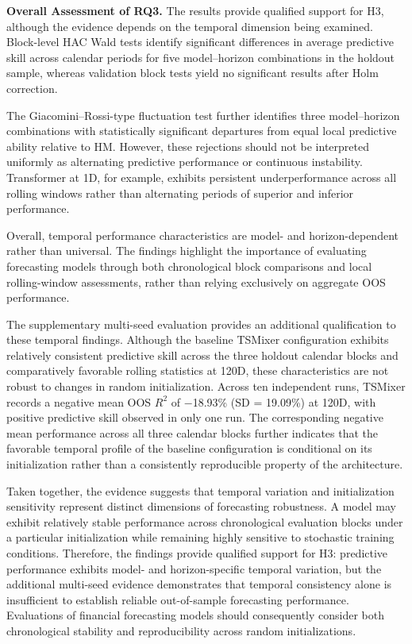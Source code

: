 \documentclass[12pt,twoside]{ord}
\begin{document}
\medskip
\noindent\textbf{Overall Assessment of RQ3.}
The results provide qualified support for H3, although the evidence depends on the temporal dimension being examined. Block-level HAC Wald tests identify significant differences in average predictive skill across calendar periods for five model--horizon combinations in the holdout sample, whereas validation block tests yield no significant results after Holm correction.

The Giacomini--Rossi-type fluctuation test further identifies three model--horizon combinations with statistically significant departures from equal local predictive ability relative to HM. However, these rejections should not be interpreted uniformly as alternating predictive performance or continuous instability. Transformer at 1D, for example, exhibits persistent underperformance across all rolling windows rather than alternating periods of superior and inferior performance.

Overall, temporal performance characteristics are model- and horizon-dependent rather than universal. The findings highlight the importance of evaluating forecasting models through both chronological block comparisons and local rolling-window assessments, rather than relying exclusively on aggregate OOS performance.

The supplementary multi-seed evaluation provides an additional qualification to these temporal findings. Although the baseline TSMixer configuration exhibits relatively consistent predictive skill across the three holdout calendar blocks and comparatively favorable rolling statistics at 120D, these characteristics are not robust to changes in random initialization. Across ten independent runs, TSMixer records a negative mean OOS $R^2$ of $-$18.93\% (SD = 19.09\%) at 120D, with positive predictive skill observed in only one run. The corresponding negative mean performance across all three calendar blocks further indicates that the favorable temporal profile of the baseline configuration is conditional on its initialization rather than a consistently reproducible property of the architecture.

Taken together, the evidence suggests that temporal variation and initialization sensitivity represent distinct dimensions of forecasting robustness. A model may exhibit relatively stable performance across chronological evaluation blocks under a particular initialization while remaining highly sensitive to stochastic training conditions. Therefore, the findings provide qualified support for H3: predictive performance exhibits model- and horizon-specific temporal variation, but the additional multi-seed evidence demonstrates that temporal consistency alone is insufficient to establish reliable out-of-sample forecasting performance. Evaluations of financial forecasting models should consequently consider both chronological stability and reproducibility across random initializations.
\end{document}
